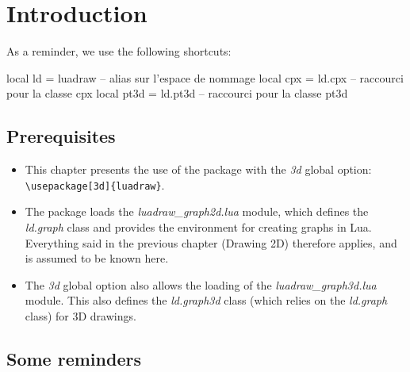 \section{Introduction}

As a reminder, we use the following shortcuts:

\begin{Luacode}
local ld = luadraw -- alias sur l'espace de nommage
local cpx = ld.cpx -- raccourci pour la classe cpx
local pt3d = ld.pt3d -- raccourci pour la classe pt3d
\end{Luacode}

\subsection{Prerequisites}

\begin{itemize}
    \item This chapter presents the use of the \luadrawenv package with the \emph{3d} global option:
\verb|\usepackage[3d]{luadraw}|.
    \item The package loads the \emph{luadraw\_graph2d.lua} module, which defines the \emph{ld.graph} class and provides the \luadrawenv environment for creating graphs in Lua. Everything said in the previous chapter (Drawing 2D) therefore applies, and is assumed to be known here.
    \item The \emph{3d} global option also allows the loading of the \emph{luadraw\_graph3d.lua} module. This also defines the \emph{ld.graph3d} class (which relies on the \emph{ld.graph} class) for 3D drawings.
\end{itemize}

\subsection{Some reminders}

